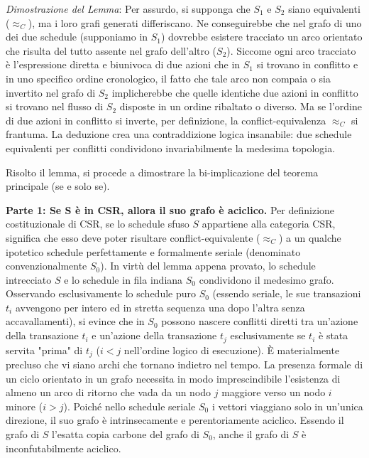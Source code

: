 \textit{Dimostrazione del Lemma}: Per assurdo, si supponga che $S_1$ e $S_2$ siano equivalenti ($\approx_C$), ma i loro grafi generati differiscano. Ne conseguirebbe che nel grafo di uno dei due schedule (supponiamo in $S_1$) dovrebbe esistere tracciato un arco orientato che risulta del tutto assente nel grafo dell'altro ($S_2$). Siccome ogni arco tracciato è l'espressione diretta e biunivoca di due azioni che in $S_1$ si trovano in conflitto e in uno specifico ordine cronologico, il fatto che tale arco non compaia o sia invertito nel grafo di $S_2$ implicherebbe che quelle identiche due azioni in conflitto si trovano nel flusso di $S_2$ disposte in un ordine ribaltato o diverso. Ma se l'ordine di due azioni in conflitto si inverte, per definizione, la conflict-equivalenza $\approx_C$ si frantuma. La deduzione crea una contraddizione logica insanabile: due schedule equivalenti per conflitti condividono invariabilmente la medesima topologia.

Risolto il lemma, si procede a dimostrare la bi-implicazione del teorema principale (se e solo se).

\textbf{Parte 1: Se S è in CSR, allora il suo grafo è aciclico.}
Per definizione costituzionale di CSR, se lo schedule sfuso $S$ appartiene alla categoria CSR, significa che esso deve poter risultare conflict-equivalente ($\approx_C$) a un qualche ipotetico schedule perfettamente e formalmente seriale (denominato convenzionalmente $S_0$). In virtù del lemma appena provato, lo schedule intrecciato $S$ e lo schedule in fila indiana $S_0$ condividono il medesimo grafo. Osservando esclusivamente lo schedule puro $S_0$ (essendo seriale, le sue transazioni $t_i$ avvengono per intero ed in stretta sequenza una dopo l'altra senza accavallamenti), si evince che in $S_0$ possono nascere conflitti diretti tra un'azione della transazione $t_i$ e un'azione della transazione $t_j$ esclusivamente se $t_i$ è stata servita "prima" di $t_j$ ($i < j$ nell'ordine logico di esecuzione). È materialmente precluso che vi siano archi che tornano indietro nel tempo. La presenza formale di un ciclo orientato in un grafo necessita in modo imprescindibile l'esistenza di almeno un arco di ritorno che vada da un nodo $j$ maggiore verso un nodo $i$ minore ($i > j$). Poiché nello schedule seriale $S_0$ i vettori viaggiano solo in un'unica direzione, il suo grafo è intrinsecamente e perentoriamente aciclico. Essendo il grafo di $S$ l'esatta copia carbone del grafo di $S_0$, anche il grafo di $S$ è inconfutabilmente aciclico.

